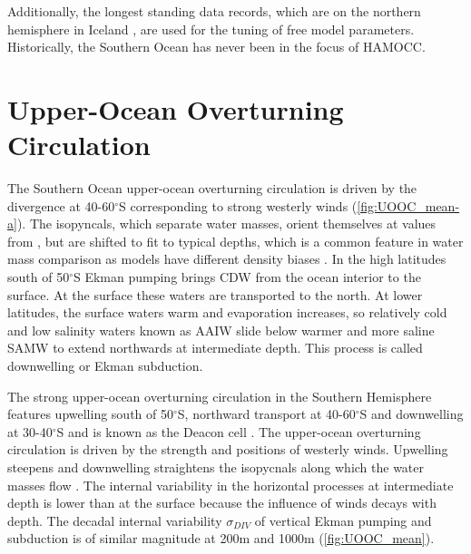 Additionally, the longest standing data records, which are on the northern hemisphere in Iceland \citep{Six1996}, are used for the tuning of free model parameters. Historically, the Southern Ocean has never been in the focus of \acs{HAMOCC}. 









\clearpage

\section{Upper-Ocean Overturning Circulation}
\label{sec:UOOC}

The Southern Ocean upper-ocean overturning circulation is driven by the divergence at 40-60$^\circ$S corresponding to strong westerly winds (\autoref{fig:UOOC_mean-a}). 
The isopyncals, which separate water masses, orient themselves at values from \cite{Sallee2013a}, but are shifted to fit to typical depths, which is a common feature in water mass comparison as models have different density biases \citep{Sallee2013a}. 
In the high latitudes south of 50$^\circ$S Ekman pumping brings \ac{CDW} from the ocean interior to the surface. At the surface these waters are transported to the north. At lower latitudes, the surface waters warm and evaporation increases, so relatively cold and low salinity waters known as \ac{AAIW} slide below warmer and more saline \ac{SAMW} to extend northwards at intermediate depth. This process is called downwelling or Ekman subduction.  

The strong upper-ocean overturning circulation in the Southern Hemisphere features upwelling south of 50$^\circ$S, northward transport at 40-60$^\circ$S and downwelling at 30-40$^\circ$S and is known as the Deacon cell \citep{Doeoes1993,Speer2000}. The upper-ocean overturning circulation is driven by the strength and positions of westerly winds. Upwelling steepens and downwelling straightens the isopycnals along which the water masses flow \citep{Marshall2012}. The internal variability in the horizontal processes at intermediate depth is lower than at the surface because the influence of winds decays with depth. The decadal internal variability $\sigma_{DIV}$ of vertical Ekman pumping and subduction is of similar magnitude at 200m and 1000m (\autoref{fig:UOOC_mean}).\newline

